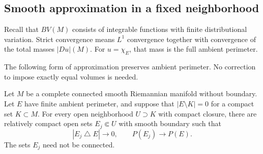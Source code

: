 \subsection{Smooth approximation in a fixed neighborhood}

Recall that $BV(M)$ consists of integrable functions with finite
distributional variation. Strict convergence means $L^1$ convergence
together with convergence of the total masses $|Du|(M)$. For
$u=\chi_E$, that mass is the full ambient perimeter.

The following form of approximation preserves ambient perimeter. No
correction to impose exactly equal volumes is needed.

\begin{lemma}\label{lem:smooth-bv-approximation}
Let $M$ be a complete connected smooth Riemannian manifold without
boundary. Let $E$ have finite ambient perimeter, and suppose that
$|E\setminus K|=0$ for a compact set $K\subset M$. For every open
neighborhood $U\supset K$ with compact closure, there are relatively
compact open sets $E_j\Subset U$ with smooth boundary such that
\[
 |E_j\mathbin{\triangle}E|\longrightarrow0,
 \qquad P(E_j)\longrightarrow P(E).
\]
The sets $E_j$ need not be connected.
\end{lemma}

